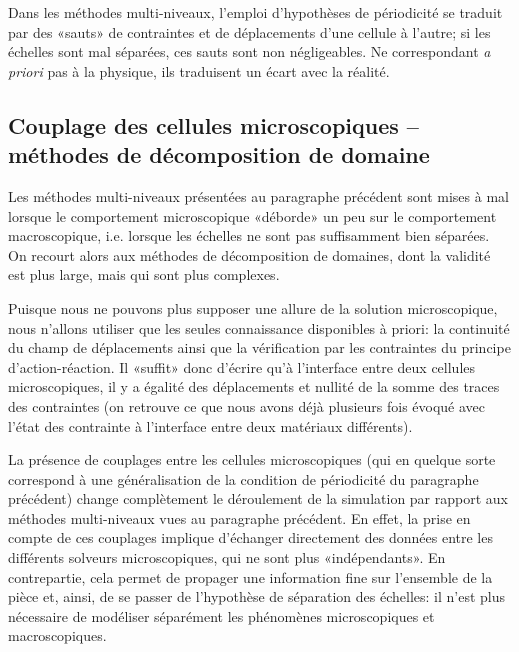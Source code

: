 Dans les méthodes multi-niveaux, l'emploi d'hypothèses de périodicité se traduit par des «sauts» de contraintes et de déplacements d'une cellule à l'autre; si les échelles sont mal séparées, ces sauts sont non négligeables. Ne correspondant \emph{a priori} pas à la physique, ils traduisent un écart avec la réalité.



\medskip
\subsection{Couplage des cellules microscopiques -- méthodes de décomposition de domaine}\label{Sec-dec}

Les méthodes multi-niveaux présentées au paragraphe précédent sont mises à mal lorsque le comportement microscopique «déborde» un peu sur le comportement macroscopique, i.e. lorsque les échelles ne sont pas suffisamment bien séparées. On recourt alors aux méthodes de décomposition de domaines, dont la validité est plus large, mais qui sont plus complexes.

\medskip
Puisque nous ne pouvons plus supposer une allure de la solution microscopique, nous n'allons utiliser que les seules connaissance disponibles à priori: la continuité du champ de déplacements ainsi que la vérification par les contraintes du principe d'action-réaction. Il «suffit» donc d'écrire qu'à l'interface entre deux cellules microscopiques, il y a égalité des déplacements et nullité de la somme des traces des contraintes (on retrouve ce que nous avons déjà plusieurs fois évoqué avec l'état des contrainte à l'interface entre deux matériaux différents).

\medskip
La présence de couplages entre les cellules microscopiques (qui en quelque sorte correspond à une généralisation de la condition de périodicité du paragraphe précédent) change complètement le déroulement de la simulation par rapport aux méthodes multi-niveaux vues au paragraphe précédent. En effet, la prise en compte de ces couplages implique d'échanger directement des données entre les différents solveurs microscopiques, qui ne sont plus «indépendants». En contrepartie, cela permet de propager une information fine sur l'ensemble de la pièce et, ainsi, de se passer de l'hypothèse de séparation des échelles: il n'est plus nécessaire de modéliser séparément les phénomènes microscopiques et macroscopiques.

